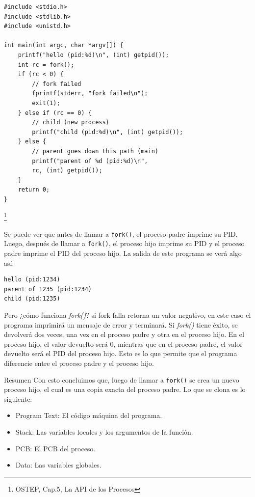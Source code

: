 \documentclass{article}
\begin{document}
\begin{verbatim}
#include <stdio.h>
#include <stdlib.h>
#include <unistd.h>

int main(int argc, char *argv[]) {
    printf("hello (pid:%d)\n", (int) getpid());
    int rc = fork();
    if (rc < 0) {
        // fork failed
        fprintf(stderr, "fork failed\n");
        exit(1);
    } else if (rc == 0) {
        // child (new process)
        printf("child (pid:%d)\n", (int) getpid());
    } else {
        // parent goes down this path (main)
        printf("parent of %d (pid:%d)\n",
        rc, (int) getpid());
    }
    return 0;
}
\end{verbatim}

\footnote{OSTEP, Cap.5, La API de los Procesos}

Se puede ver que antes de llamar a \texttt{fork()}, el proceso padre imprime su PID. Luego, después de llamar a \texttt{fork()}, el proceso hijo imprime su PID y el proceso padre imprime el PID del proceso hijo. La salida de este programa se verá algo así:

\begin{verbatim}
hello (pid:1234)
parent of 1235 (pid:1234)
child (pid:1235)
\end{verbatim}

Pero ¿cómo funciona \textit{fork()}? si fork falla retorna un valor negativo, en este caso el programa imprimirá un mensaje de error y terminará. Si \textit{fork()} tiene éxito, se devolverá dos veces, una vez en el proceso padre y otra en el proceso hijo. En el proceso hijo, el valor devuelto será 0, mientras que en el proceso padre, el valor devuelto será el PID del proceso hijo. Esto es lo que permite que el programa diferencie entre el proceso padre y el proceso hijo.

\begin{summary}{Resumen}
    Con esto concluimos que, luego de llamar a \texttt{fork()} se crea un nuevo proceso hijo, el cual es una copia exacta del proceso padre. Lo que se clona es lo siguiente:
    \begin{itemize}
        \item Program Text: El código máquina del programa.
        \item Stack: Las variables locales y los argumentos de la función.
        \item PCB: El PCB del proceso.
        \item Data: Las variables globales.
    \end{itemize}
\end{summary}
\end{document}
